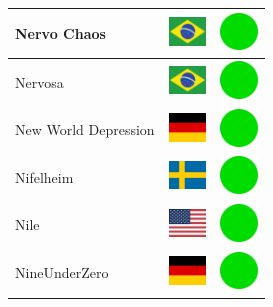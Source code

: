 \documentclass[12pt, a4paper, twoside]{report}
\begin{document}
\begin{center}
\begin{longtable}{|p{5cm}|p{2cm}|p{2cm}|}
 Nervo Chaos                                                & \includegraphics[width=1cm]{../4x3/br} &   \includegraphics[width=1cm]{../likes/y} \\ \hline
 Nervosa                                                    & \includegraphics[width=1cm]{../4x3/br} &   \includegraphics[width=1cm]{../likes/y} \\ \hline
 New World Depression                                       & \includegraphics[width=1cm]{../4x3/de} &   \includegraphics[width=1cm]{../likes/y} \\ \hline
 Nifelheim                                                  & \includegraphics[width=1cm]{../4x3/se} &   \includegraphics[width=1cm]{../likes/y} \\ \hline
 Nile                                                       & \includegraphics[width=1cm]{../4x3/us} &   \includegraphics[width=1cm]{../likes/y} \\ \hline
 NineUnderZero                                              & \includegraphics[width=1cm]{../4x3/de} &   \includegraphics[width=1cm]{../likes/y} \\ \hline

\end{longtable}
\end{center}
\end{document}
